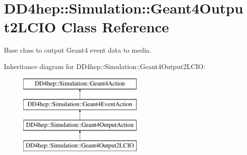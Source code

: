 \hypertarget{class_d_d4hep_1_1_simulation_1_1_geant4_output2_l_c_i_o}{}\section{D\+D4hep\+:\+:Simulation\+:\+:Geant4\+Output2\+L\+C\+IO Class Reference}
\label{class_d_d4hep_1_1_simulation_1_1_geant4_output2_l_c_i_o}


Base class to output Geant4 event data to media.  


Inheritance diagram for D\+D4hep\+:\+:Simulation\+:\+:Geant4\+Output2\+L\+C\+IO\+:\begin{figure}[H]
\begin{center}
\leavevmode
\includegraphics[height=4.000000cm]{class_d_d4hep_1_1_simulation_1_1_geant4_output2_l_c_i_o}
\end{center}
\end{figure}
